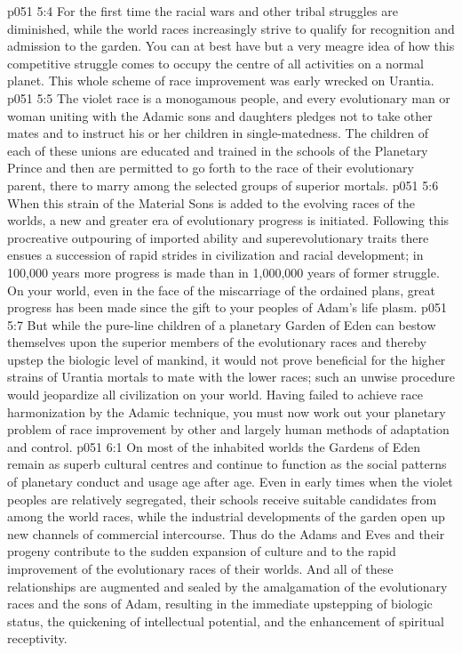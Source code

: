 \vs p051 5:4 For the first time the racial wars and other tribal struggles are diminished, while the world races increasingly strive to qualify for recognition and admission to the garden. You can at best have but a very meagre idea of how this competitive struggle comes to occupy the centre of all activities on a normal planet. This whole scheme of race improvement was early wrecked on Urantia.
\vs p051 5:5 \pc The violet race is a monogamous people, and every evolutionary man or woman uniting with the Adamic sons and daughters pledges not to take other mates and to instruct his or her children in single\hyp{}matedness. The children of each of these unions are educated and trained in the schools of the Planetary Prince and then are permitted to go forth to the race of their evolutionary parent, there to marry among the selected groups of superior mortals.
\vs p051 5:6 When this strain of the Material Sons is added to the evolving races of the worlds, a new and greater era of evolutionary progress is initiated. Following this procreative outpouring of imported ability and superevolutionary traits there ensues a succession of rapid strides in civilization and racial development; in 100,000 years more progress is made than in 1,000,000 years of former struggle. On your world, even in the face of the miscarriage of the ordained plans, great progress has been made since the gift to your peoples of Adam’s life plasm.
\vs p051 5:7 But while the pure\hyp{}line children of a planetary Garden of Eden can bestow themselves upon the superior members of the evolutionary races and thereby upstep the biologic level of mankind, it would not prove beneficial for the higher strains of Urantia mortals to mate with the lower races; such an unwise procedure would jeopardize all civilization on your world. Having failed to achieve race harmonization by the Adamic technique, you must now work out your planetary problem of race improvement by other and largely human methods of adaptation and control.
\vs p051 6:1 On most of the inhabited worlds the Gardens of Eden remain as superb cultural centres and continue to function as the social patterns of planetary conduct and usage age after age. Even in early times when the violet peoples are relatively segregated, their schools receive suitable candidates from among the world races, while the industrial developments of the garden open up new channels of commercial intercourse. Thus do the Adams and Eves and their progeny contribute to the sudden expansion of culture and to the rapid improvement of the evolutionary races of their worlds. And all of these relationships are augmented and sealed by the amalgamation of the evolutionary races and the sons of Adam, resulting in the immediate upstepping of biologic status, the quickening of intellectual potential, and the enhancement of spiritual receptivity.
